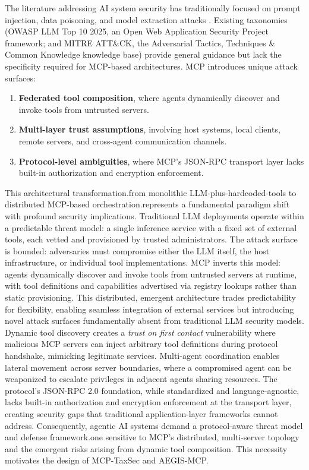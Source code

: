 \documentclass[12pt,twocolumn,journal]{IEEEtran}
\begin{document}
The literature addressing AI system security has traditionally focused on prompt injection, data poisoning, and model extraction attacks \cite{Wei2023,Carlini2023}. Existing taxonomies (OWASP LLM Top 10 2025, an Open Web Application Security Project framework; and MITRE ATT\&CK, the Adversarial Tactics, Techniques \& Common Knowledge knowledge base) provide general guidance but lack the specificity required for MCP-based architectures. MCP introduces unique attack surfaces:
\begin{enumerate}
\item \textbf{Federated tool composition}, where agents dynamically discover and invoke tools from untrusted servers.
\item \textbf{Multi-layer trust assumptions}, involving host systems, local clients, remote servers, and cross-agent communication channels.
\item \textbf{Protocol-level ambiguities}, where MCP's JSON-RPC transport layer lacks built-in authorization and encryption enforcement.
\end{enumerate}

This architectural transformation.from monolithic LLM-plus-hardcoded-tools to distributed MCP-based orchestration.represents a fundamental paradigm shift with profound security implications. Traditional LLM deployments operate within a predictable threat model: a single inference service with a fixed set of external tools, each vetted and provisioned by trusted administrators. The attack surface is bounded: adversaries must compromise either the LLM itself, the host infrastructure, or individual tool implementations. MCP inverts this model: agents dynamically discover and invoke tools from untrusted servers at runtime, with tool definitions and capabilities advertised via registry lookups rather than static provisioning. This distributed, emergent architecture trades predictability for flexibility, enabling seamless integration of external services but introducing novel attack surfaces fundamentally absent from traditional LLM security models. Dynamic tool discovery creates a \textit{trust on first contact} vulnerability where malicious MCP servers can inject arbitrary tool definitions during protocol handshake, mimicking legitimate services. Multi-agent coordination enables lateral movement across server boundaries, where a compromised agent can be weaponized to escalate privileges in adjacent agents sharing resources. The protocol's JSON-RPC 2.0 foundation, while standardized and language-agnostic, lacks built-in authorization and encryption enforcement at the transport layer, creating security gaps that traditional application-layer frameworks cannot address. Consequently, agentic AI systems demand a protocol-aware threat model and defense framework.one sensitive to MCP's distributed, multi-server topology and the emergent risks arising from dynamic tool composition. This necessity motivates the design of MCP-TaxSec and AEGIS-MCP.
\end{document}
